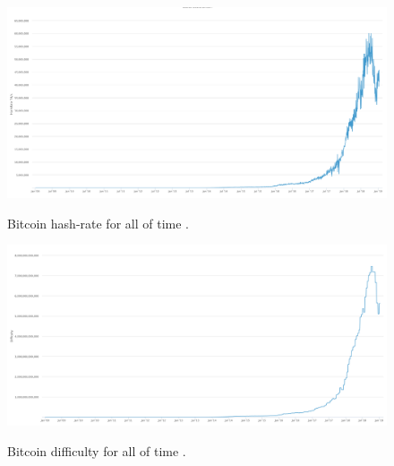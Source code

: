 \begin{figure}[h!]
  \centering
  \includegraphics[width = 15cm]{./figures/hashrate-all-time}\\[0.5cm] 
  \caption{Bitcoin hash-rate for all of time \protect\footnotemark. }
  \label{fig:all-time-hash-rate}
\end{figure}
\begin{figure}[h!]
  \centering
  \includegraphics[width = 15cm]{./figures/difficulty-all-time}\\[0.5cm] 
  \caption{Bitcoin difficulty for all of time \protect\footnotemark.}
  \label{fig:all-time-difficulty}
\end{figure}

